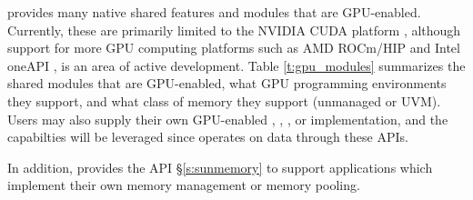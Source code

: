 {\sundials} provides many native shared features and modules that are GPU-enabled.
Currently, these are primarily limited to the NVIDIA CUDA platform
\cite{cuda_site}, although support for more GPU computing platforms such as AMD
ROCm/HIP \cite{rocm_site} and Intel oneAPI \cite{oneAPI_site}, is an area of
active development.  Table \ref{t:gpu_modules} summarizes the shared {\sundials}
modules that are GPU-enabled, what GPU programming environments they support,
and what class of memory they support (unmanaged or UVM).  Users may also
supply their own GPU-enabled , , ,
or  implementation, and the capabilties will be leveraged
since {\sundials} operates on data through these APIs.

In addition, {\sundials} provides the  API \S\ref{s:sunmemory}
to support applications which implement their own memory management or memory
pooling.

